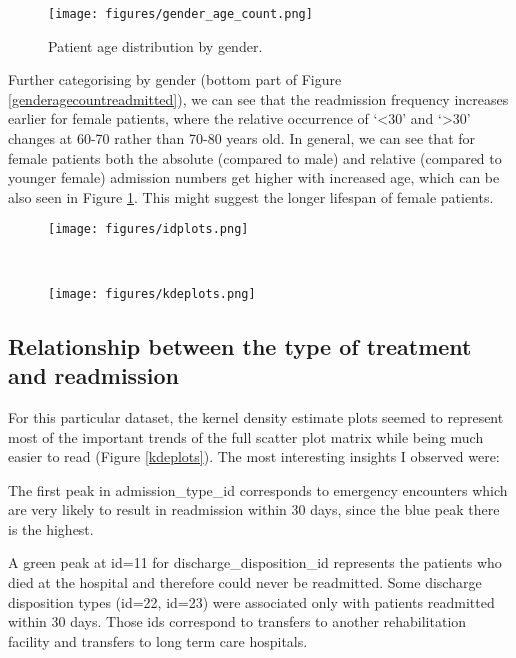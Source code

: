 \documentclass[10pt, twocolumn]{article}
\begin{document}
\begin{figure}[htb!]
	\centering
	\texttt{[image: figures/gender\_age\_count.png]}
	\caption{Patient age distribution by gender.}\label{genderagecount}
\end{figure}

Further categorising by gender (bottom part of Figure \ref{genderagecountreadmitted}), we can see that the readmission frequency increases earlier for female patients, where the relative occurrence of `<30' and `>30' changes at 60-70 rather than 70-80 years old. In general, we can see that for female patients both the absolute (compared to male) and relative (compared to younger female) admission numbers get higher with increased age, which can be also seen in Figure \ref{genderagecount}. This might suggest the longer lifespan of female patients.

\begin{figure*}[t!]
	\centering
	\begin{subfigure}[t]{\textwidth}
        \centering
        \texttt{[image: figures/idplots.png]}
	\end{subfigure}
	~
	\begin{subfigure}[t]{\textwidth}
        \centering
		\texttt{[image: figures/kdeplots.png]}
    \end{subfigure}
	\caption{Distributions of admission and discharge identifiers; kernel density estimates for numerical features.}\label{kdeplots}
  \end{figure*}





\subsection{Relationship between the type of treatment and readmission}

For this particular dataset, the kernel density estimate plots seemed to represent most of the important trends of the full scatter plot matrix while being much easier to read (Figure \ref{kdeplots}). The most interesting insights I observed were:

The first peak in admission\_type\_id corresponds to emergency encounters which are very likely to result in readmission within 30 days, since the blue peak there is the highest.

A green peak at id=11 for discharge\_disposition\_id represents the patients who died at the hospital and therefore could never be readmitted. Some discharge disposition types (id=22, id=23) were associated only with patients readmitted within 30 days. Those ids correspond to transfers to another rehabilitation facility and transfers to long term care hospitals.
\end{document}
